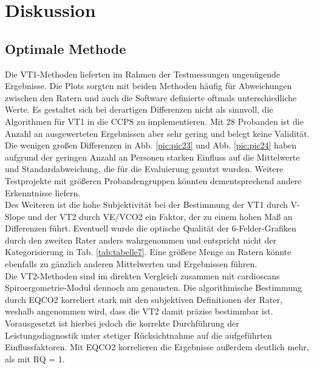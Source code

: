\chapter{Diskussion}

\section{Optimale Methode}

Die VT1-Methoden lieferten im Rahmen der Testmessungen ungenügende Ergebnisse. Die Plots sorgten mit beiden Methoden häufig für Abweichungen zwischen den Ratern und auch die Software definierte oftmals unterschiedliche Werte. Es gestaltet sich bei derartigen Differenzen nicht als sinnvoll, die Algorithmen für VT1 in die \acs{CCPS} zu implementieren. Mit 28 Probanden ist die Anzahl an ausgewerteten Ergebnissen aber sehr gering und belegt keine Validität. Die wenigen großen Differenzen in Abb. \ref{pic:pic23} und Abb. \ref{pic:pic24} haben aufgrund der geringen Anzahl an Personen starken Einfluss auf die Mittelwerte und Standardabweichung, die für die Evaluierung genutzt wurden. Weitere Testprojekte mit größeren Probandengruppen könnten dementsprechend andere Erkenntnisse liefern.\\
Des Weiteren ist die hohe Subjektivität bei der Bestimmung der VT1 durch V-Slope und der VT2 durch \acs{VE}/\acs{VCO2} ein Faktor, der zu einem hohen Maß an Differenzen führt. Eventuell wurde die optische Qualität der 6-Felder-Grafiken durch den zweiten Rater anders wahrgenommen und entspricht nicht der Kategorisierung in Tab. \ref{tab:tabelle7}. Eine größere Menge an Ratern könnte ebenfalls zu gänzlich anderen Mittelwerten und Ergebnissen führen.\\
Die VT2-Methoden sind im direkten Vergleich zusammen mit cardioscans Spiroergometrie-Modul dennoch am genausten. Die algorithmische Bestimmung durch \acs{EQCO2} korreliert stark mit den subjektiven Definitionen der Rater, weshalb angenommen wird, dass die VT2 damit präzise bestimmbar ist. Vorausgesetzt ist hierbei jedoch die korrekte Durchführung der Leistungsdiagnostik unter stetiger Rücksichtnahme auf die aufgeführten Einflussfaktoren. Mit \acs{EQCO2} korrelieren die Ergebnisse außerdem deutlich mehr, als mit RQ = 1.\\
